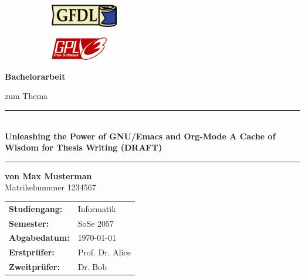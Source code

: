 
\begin{titlepage}

	\begin{figure}[!h]
		\begin{subfigure}[b]{0.5\linewidth}
			\includegraphics[height=1cm]{./images/gfdl}
		\end{subfigure}
		\hfill
		\begin{subfigure}[b]{0.15\linewidth}
			\includegraphics[height=1cm]{./images/gplv3}
		\end{subfigure}
	\end{figure}

        \vspace{1cm}

	\begin{center}
		\textbf{\LARGE{Bachelorarbeit}}

		\vspace{.5cm}


		\vspace{.5cm}

		zum Thema

		\vspace{1cm}
		\rule{\textwidth}{2pt}
		$~~$\\

		\textbf{
			\LARGE{Unleashing the Power of GNU/Emacs and Org-Mode} \break
			\Large{A Cache of Wisdom for Thesis Writing} \break
			(DRAFT)
		}

		\rule{\textwidth}{2pt}
		\vspace{2cm}

		\textbf{von \Large{Max Musterman}}\\
		\Large{Matrikelnummer  1234567}\\
	\end{center}

	\vfill


	\begin{tabular}{ll}
		\textbf{Studiengang:} & Informatik      \\
		\textbf{Semester:}    & SoSe 2057       \\
		\textbf{Abgabedatum:} & \today          \\
		\textbf{Erstprüfer:}  & Prof. Dr. Alice \\
		\textbf{Zweitprüfer:} & Dr. Bob         \\
	\end{tabular}


\end{titlepage}
